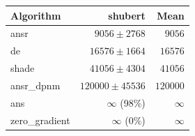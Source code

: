 \begin{tabular}{lrr}
\toprule
Algorithm & shubert & Mean \\
\midrule
ansr & $9056 \pm 2768$ & $9056$ \\
de & $16576 \pm 1664$ & $16576$ \\
shade & $41056 \pm 4304$ & $41056$ \\
ansr\_dpnm & $120000 \pm 45536$ & $120000$ \\
ans & $\infty$ (98\%) & $\infty$ \\
zero\_gradient & $\infty$ (0\%) & $\infty$ \\
\bottomrule
\end{tabular}
